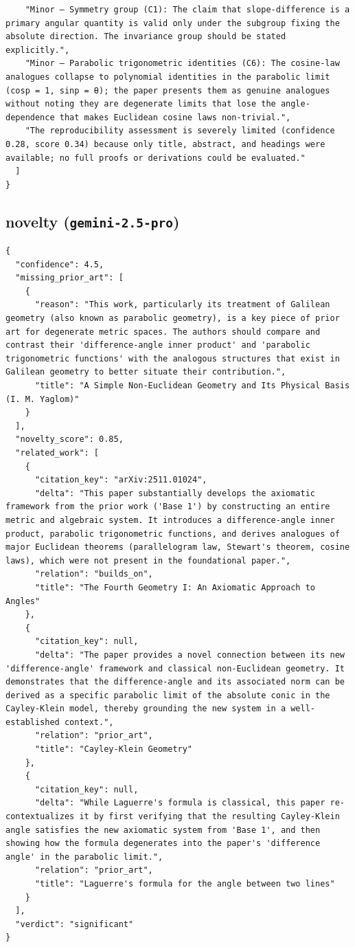 \documentclass[11pt]{article}
\begin{document}
\begin{verbatim}
    "Minor — Symmetry group (C1): The claim that slope-difference is a primary angular quantity is valid only under the subgroup fixing the absolute direction. The invariance group should be stated explicitly.",
    "Minor — Parabolic trigonometric identities (C6): The cosine-law analogues collapse to polynomial identities in the parabolic limit (cosp = 1, sinp = θ); the paper presents them as genuine analogues without noting they are degenerate limits that lose the angle-dependence that makes Euclidean cosine laws non-trivial.",
    "The reproducibility assessment is severely limited (confidence 0.28, score 0.34) because only title, abstract, and headings were available; no full proofs or derivations could be evaluated."
  ]
}
\end{verbatim}

\subsection*{novelty (\texttt{gemini-2.5-pro})}
\begin{verbatim}
{
  "confidence": 4.5,
  "missing_prior_art": [
    {
      "reason": "This work, particularly its treatment of Galilean geometry (also known as parabolic geometry), is a key piece of prior art for degenerate metric spaces. The authors should compare and contrast their 'difference-angle inner product' and 'parabolic trigonometric functions' with the analogous structures that exist in Galilean geometry to better situate their contribution.",
      "title": "A Simple Non-Euclidean Geometry and Its Physical Basis (I. M. Yaglom)"
    }
  ],
  "novelty_score": 0.85,
  "related_work": [
    {
      "citation_key": "arXiv:2511.01024",
      "delta": "This paper substantially develops the axiomatic framework from the prior work ('Base 1') by constructing an entire metric and algebraic system. It introduces a difference-angle inner product, parabolic trigonometric functions, and derives analogues of major Euclidean theorems (parallelogram law, Stewart's theorem, cosine laws), which were not present in the foundational paper.",
      "relation": "builds_on",
      "title": "The Fourth Geometry I: An Axiomatic Approach to Angles"
    },
    {
      "citation_key": null,
      "delta": "The paper provides a novel connection between its new 'difference-angle' framework and classical non-Euclidean geometry. It demonstrates that the difference-angle and its associated norm can be derived as a specific parabolic limit of the absolute conic in the Cayley-Klein model, thereby grounding the new system in a well-established context.",
      "relation": "prior_art",
      "title": "Cayley-Klein Geometry"
    },
    {
      "citation_key": null,
      "delta": "While Laguerre's formula is classical, this paper re-contextualizes it by first verifying that the resulting Cayley-Klein angle satisfies the new axiomatic system from 'Base 1', and then showing how the formula degenerates into the paper's 'difference angle' in the parabolic limit.",
      "relation": "prior_art",
      "title": "Laguerre's formula for the angle between two lines"
    }
  ],
  "verdict": "significant"
}
\end{verbatim}
\end{document}
